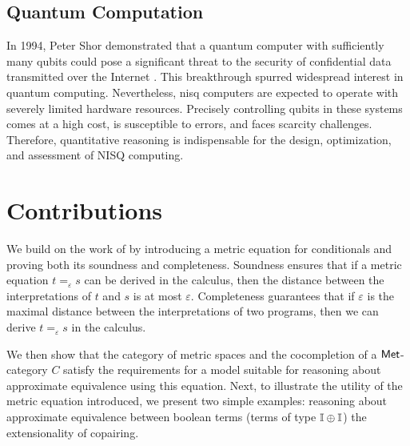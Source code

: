 \subsection*{Quantum Computation}

In 1994, Peter Shor demonstrated that a quantum computer with sufficiently many qubits could pose a significant threat to the security of confidential data transmitted over the Internet \cite{shor1994algorithms}. This breakthrough spurred widespread interest in quantum computing. Nevertheless, \acrfull{nisq}  computers are expected to operate with severely limited hardware resources. Precisely controlling qubits in these systems comes at a high cost, is susceptible to errors, and faces scarcity challenges. Therefore, quantitative reasoning is indispensable for the design, optimization, and assessment of NISQ computing. 








\section{Contributions}
We build on the work of \cite{dahlqvist2023syntactic} by introducing a metric equation for conditionals and proving both its soundness and completeness. Soundness ensures that if a metric equation $t =_{\varepsilon} s$ can be derived in the calculus, then the distance between the interpretations of $t$ and $s$ is at most $\varepsilon$. Completeness guarantees that if $\varepsilon$ is the maximal distance between the interpretations of two programs, then we can derive $t =_{\varepsilon} s$ in the calculus. 

We then show that the category of metric spaces and the cocompletion of a $ \mathsf{Met} $-category $ C $ satisfy the requirements for a model suitable for reasoning about approximate equivalence using this equation.  Next, to illustrate the utility of the metric equation introduced, we present two simple examples: reasoning about approximate equivalence between boolean terms (\ie terms of type $ \mathbb{I} \oplus \mathbb{I} $) the extensionality of copairing.


